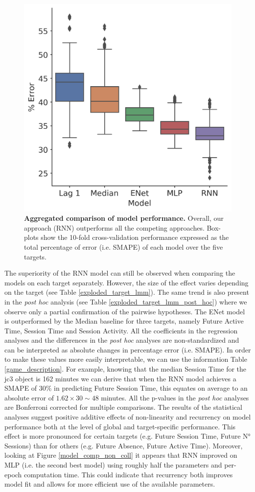 \begin{figure}[h]
\centering
\includegraphics[width=.5\columnwidth]{images/chapter_3/performance_collapsed_32.png}
\caption{\textbf{Aggregated comparison of model performance.} Overall, our approach (RNN) outperforms all the competing approaches. Box-plots show the 10-fold cross-validation performance expressed as the total percentage of error (i.e. SMAPE) of each model over the five targets.}
\label{model_comp_coll} 
\end{figure}




The superiority of the RNN model can still be observed when comparing the models on each target separately. However, the size of the effect varies depending on the target (see Table \ref{exploded_target_lmm}). The same trend is also present in the \textit{post hoc} analysis (see Table \ref{exploded_target_lmm_post_hoc}) where we observe only a partial confirmation of the pairwise hypotheses. The ENet model is outperformed by the Median baseline for three targets, namely Future Active Time, Session Time and Session Activity. All the coefficients in the regression analyses and the differences in the \textit{post hoc} analyses are non-standardized and can be interpreted as absolute changes in percentage error (i.e. SMAPE). In order to make these values more easily interpretable, we can use the information Table \ref{game_description}. For example, knowing that the median Session Time for the jc3 object is 162 minutes we can derive that when the RNN model achieves a SMAPE of 30\% in predicting Future Session Time, this equates on average to an absolute error of $1.62 \times 30 \sim 48$ minutes. All the p-values in the \textit{post hoc} analyses are Bonferroni corrected for multiple comparisons. The results of the statistical analyses suggest positive additive effects of non-linearity and recurrency on model performance both at the level of global and target-specific performance. This effect is more pronounced for certain targets (e.g. Future Session Time, Future N° Sessions) than for others (e.g. Future Absence, Future Active Time). Moreover, looking at Figure \ref{model_comp_non_coll} it appears that RNN improved on MLP (i.e. the second best model) using roughly half the parameters and per-epoch computation time. This could indicate that recurrency both improves model fit and allows for more efficient use of the available parameters.

